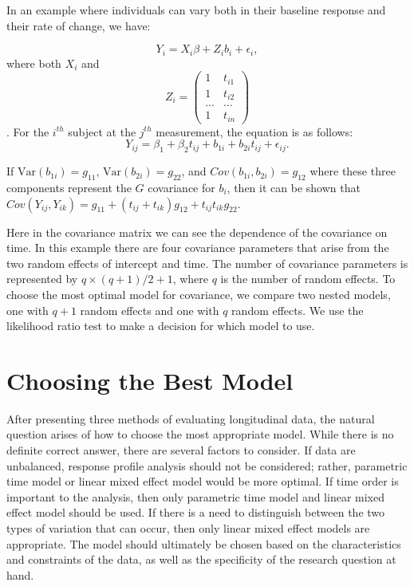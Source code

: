 \documentclass[12pt, twoside]{amherstthesis}
\begin{document}
In an example where individuals can vary both in their baseline response and their rate of change, we have:

\[Y_i = X_i\beta+Z_ib_i+\epsilon_i,\] where both \(X_i\) and \[Z_i = \begin{pmatrix} 1 & t_{i1} \\ 1 & t_{i2} \\ ... & ... \\ 1 & t_{in}\end{pmatrix}\]. For the \(i^{th}\) subject at the \(j^{th}\) measurement, the equation is as follows: \[Y_{ij} = \beta_1 + \beta_2t_{ij} +b_{1i} + b_{2i}t_{ij} + \epsilon_{ij}.\]

If \(\text{Var}(b_{1i}) = g_{11}\), \(\text{Var}(b_{2i}) = g_{22}\), and \(Cov(b_{1i},b_{2i}) = g_{12}\) where these three components represent the \(G\) covariance for \(b_i\), then
it can be shown that \(Cov(Y_{ij}, Y_{ik}) = g_{11} + (t_{ij} + t_{ik})g_{12} + t_{ij}t_{ik}g_{22}\).

Here in the covariance matrix we can see the dependence of the covariance on time. In this example there are four covariance parameters that arise from the two random effects of intercept and time. The number of covariance parameters is represented by \(q \times (q+1)/2 + 1\), where \(q\) is the number of random effects. To choose the most optimal model for covariance, we compare two nested models, one with \(q+1\) random effects and one with \(q\) random effects. We use the likelihood ratio test to make a decision for which model to use.

\hypertarget{choosing-the-best-model}{%
\section{Choosing the Best Model}\label{choosing-the-best-model}}

After presenting three methods of evaluating longitudinal data, the natural question arises of how to choose the most appropriate model. While there is no definite correct answer, there are several factors to consider. If data are unbalanced, response profile analysis should not be considered; rather, parametric time model or linear mixed effect model would be more optimal. If time order is important to the analysis, then only parametric time model and linear mixed effect model should be used. If there is a need to distinguish between the two types of variation that can occur, then only linear mixed effect models are appropriate. The model should ultimately be chosen based on the characteristics and constraints of the data, as well as the specificity of the research question at hand.
\end{document}
